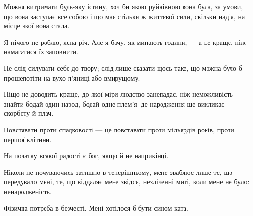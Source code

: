 \asterism

\begin{aphorism}
Можна витримати будь-яку істину, хоч би якою руйнівною вона була, за умови, що вона заступає все собою і що має стільки ж життєвої сили, скільки надія, на місце якої
вона стала.
\end{aphorism}

\asterism

\begin{aphorism}
Я нічого не роблю, ясна річ. Але я бачу, як минають години, — а це краще, ніж намагатися їх заповнити.
\end{aphorism}

\asterism

\begin{aphorism}
Не слід силувати себе до твору; слід лише сказати щось таке, що можна було б прошепотіти на вухо п'яниці або вмирущому.
\end{aphorism}

\asterism

\begin{aphorism}
Ніщо не доводить краще, до якої міри людство занепадає, ніж неможливість знайти бодай один народ, бодай одне плем'я, де народження ще викликає скорботу й плач.
\end{aphorism}

\asterism

\begin{aphorism}
Повставати проти спадковості — це повставати проти мільярдів років, проти першої клітини.
\end{aphorism}

\asterism

\begin{aphorism}
На початку всякої радості є бог, якщо й не наприкінці.
\end{aphorism}

\asterism

\begin{aphorism}
Ніколи не почуваючись затишно в теперішньому, мене зваблює лише те, що передувало мені, те, що віддаляє мене звідси, незліченні миті, 
коли мене не було: ненародженість.
\end{aphorism}

\asterism

\begin{aphorism}
Фізична потреба в безчесті. Мені хотілося б бути сином ката.
\end{aphorism}

\asterism

